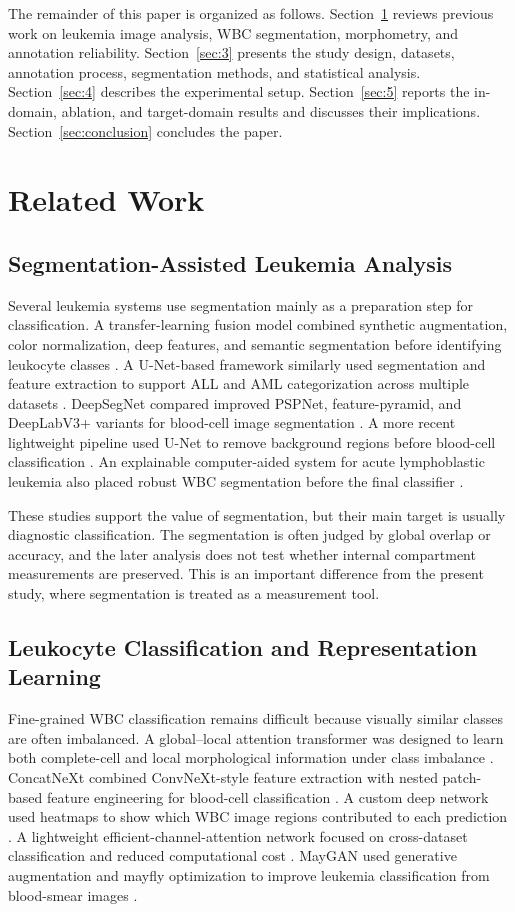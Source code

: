 \documentclass[pdflatex,sn-mathphys-num]{sn-jnl}%
\theoremstyle{thmstyleone}%
\theoremstyle{thmstyletwo}%
\theoremstyle{thmstylethree}%
\begin{document}
The remainder of this paper is organized as follows. Section~\ref{sec:2} reviews previous work on leukemia image analysis, WBC segmentation, morphometry, and annotation reliability. Section~\ref{sec:3} presents the study design, datasets, annotation process, segmentation methods, and statistical analysis. Section~\ref{sec:4} describes the experimental setup. Section~\ref{sec:5} reports the in-domain, ablation, and target-domain results and discusses their implications. Section~\ref{sec:conclusion} concludes the paper.

\section{Related Work}\label{sec:2}

\subsection{Segmentation-Assisted Leukemia Analysis}

Several leukemia systems use segmentation mainly as a preparation step for classification. A transfer-learning fusion model combined synthetic augmentation, color normalization, deep features, and semantic segmentation before identifying leukocyte classes \cite{29}. A U-Net-based framework similarly used segmentation and feature extraction to support ALL and AML categorization across multiple datasets \cite{30}. DeepSegNet compared improved PSPNet, feature-pyramid, and DeepLabV3+ variants for blood-cell image segmentation \cite{31}. A more recent lightweight pipeline used U-Net to remove background regions before blood-cell classification \cite{32}. An explainable computer-aided system for acute lymphoblastic leukemia also placed robust WBC segmentation before the final classifier \cite{33}.

These studies support the value of segmentation, but their main target is usually diagnostic classification. The segmentation is often judged by global overlap or accuracy, and the later analysis does not test whether internal compartment measurements are preserved. This is an important difference from the present study, where segmentation is treated as a measurement tool.

\subsection{Leukocyte Classification and Representation Learning}

Fine-grained WBC classification remains difficult because visually similar classes are often imbalanced. A global--local attention transformer was designed to learn both complete-cell and local morphological information under class imbalance \cite{34}. ConcatNeXt combined ConvNeXt-style feature extraction with nested patch-based feature engineering for blood-cell classification \cite{35}. A custom deep network used heatmaps to show which WBC image regions contributed to each prediction \cite{36}. A lightweight efficient-channel-attention network focused on cross-dataset classification and reduced computational cost \cite{37}. MayGAN used generative augmentation and mayfly optimization to improve leukemia classification from blood-smear images \cite{38}.
\end{document}
